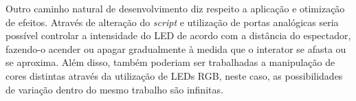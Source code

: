 Outro caminho natural de desenvolvimento diz respeito a aplicação e otimização de efeitos. Através de alteração do \textit{script} e utilização de portas analógicas seria possível controlar a intensidade do LED de acordo com a distância do espectador, fazendo-o acender ou apagar gradualmente à medida que o interator se afasta ou se aproxima. Além disso, também poderiam ser trabalhadas a manipulação de cores distintas através da utilização de LEDs RGB, neste caso, as possibilidades de variação dentro do mesmo trabalho são infinitas.

